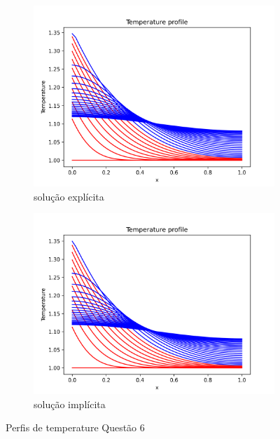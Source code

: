 \documentclass{article}
\begin{document}
\begin{figure}[h]
\centering
     \begin{subfigure}[b]{0.49\textwidth}
         \centering
         \includegraphics[width=\textwidth]{figs/q6a_temperature_profile.png}
         \caption{ solução explícita}
	\label{fig:q6a_temperature_profile}
     \end{subfigure}
     \hfill
     \begin{subfigure}[b]{0.49\textwidth}
         \centering
         \includegraphics[width=\textwidth]{figs/q6b_temperature_profile.png}
         \caption{solução implícita}
	\label{fig:q6b_temperature_profile}
     \end{subfigure}
\caption{Perfis de temperature Questão 6}
\end{figure}
\end{document}
